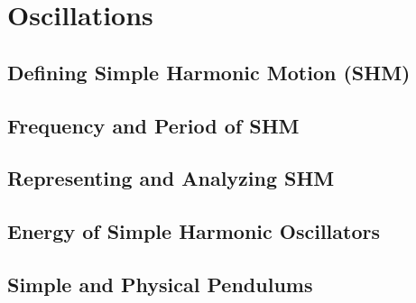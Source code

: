 \documentclass[../mech.tex]{subfiles}
\begin{document}
\chapter{Oscillations}
\section{Defining Simple Harmonic Motion (SHM)}
\section{Frequency and Period of SHM}
\section{Representing and Analyzing SHM}
\section{Energy of Simple Harmonic Oscillators}
\section{Simple and Physical Pendulums}
\end{document}
